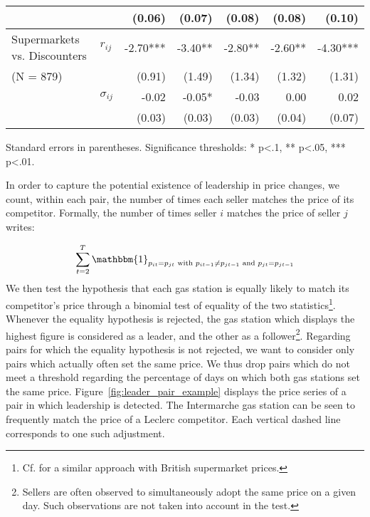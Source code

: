 \documentclass[english]{article}
\begin{document}
\begin{table}
\begin{threeparttable}
\begin{tabular}{rrrrrrr}
          &       & (0.06) & (0.07) & (0.08) & (0.08) & (0.10) \\
    \midrule
    \multicolumn{1}{l}{Supermarkets vs. Discounters} & \multicolumn{1}{l}{$r_{ij}$} & -2.70*** & -3.40** & -2.80** & -2.60** & -4.30*** \\
    \multicolumn{1}{l}{(N = 879)} &       & (0.91) & (1.49) & (1.34) & (1.32) & (1.31) \\
          & \multicolumn{1}{l}{$\sigma_{ij}$} & -0.02 & -0.05* & -0.03 & 0.00  & 0.02 \\
          &       & (0.03) & (0.03) & (0.03) & (0.04) & (0.07) \\
    \bottomrule
    \bottomrule
\end{tabular}
\begin{tablenotes}
      \small
      \item Standard errors in parentheses. Significance thresholds: * p<.1, ** p<.05, *** p<.01.
\end{tablenotes}
\end{threeparttable}
\end{table}

In order to capture the potential existence of leadership in price changes, we count, within each pair, the number of times each seller matches the price of its competitor. Formally, the number of times seller $i$ matches the price of seller $j$ writes:

\begin{align*}
\sum_{t=2}^{T}\mathbbm{1}_{p_{it} = p_{jt} \text{ with } p_{it-1} \neq p_{jt-1} \text{ and } p_{jt} = p_{jt-1}}
\end{align*}
We then test the hypothesis that each gas station is equally likely to match its competitor's price through a binomial test of equality of the two statistics\footnote{Cf. \cite{SEA13} for a similar approach with British supermarket prices.}. Whenever the equality hypothesis is rejected, the gas station which displays the highest figure is considered as a leader, and the other as a follower\footnote{Sellers are often observed to simultaneously adopt the same price on a given day. Such observations are not taken into account in the test.}. Regarding pairs for which the equality hypothesis is not rejected, we want to consider only pairs which actually often set the same price. We thus drop pairs which do not meet a threshold regarding the percentage of days on which both gas stations set the same price. Figure~\ref{fig:leader_pair_example} displays the price series of a pair in which leadership is detected. The Intermarche gas station can be seen to frequently match the price of a Leclerc competitor. Each vertical dashed line corresponds to one such adjustment.
\end{document}
